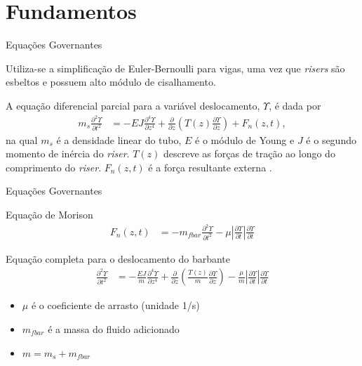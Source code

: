 \documentclass[10pt]{beamer}
\begin{document}
\section{Fundamentos}

\begin{frame}[fragile]{Equações Governantes}

\begin{block}{}
Utiliza-se a simplificação de Euler-Bernoulli para vigas, uma vez que \textit{risers} são esbeltos e possuem alto módulo de cisalhamento.
\end{block}

\begin{block}{}
A equação diferencial parcial para a variável deslocamento, $\Upsilon$, é dada por \begin{align}
	m_s \frac{\partial^2 \Upsilon}{\partial t^2} &= -E J	\frac{\partial^4 \Upsilon}{\partial z^4} + \frac{\partial}{\partial z}\left(T(z) \frac{\partial \Upsilon}{\partial z}\right) + F_n(z,t),
\end{align} na qual $m_s$ é a densidade linear do tubo, $E$ é o módulo de Young e $J$ é o segundo momento de inércia do \textit{riser}. $T(z)$ descreve as forças de tração ao longo do comprimento do \textit{riser}. $F_n(z,t)$ é a força resultante externa \cite{fabricioIFAC}.
\end{block}

\end{frame}

\begin{frame}[fragile]{Equações Governantes}
\begin{block}{Equação de Morison}
\begin{align}
	F_n(z,t) &= -m_{fbar} \frac{\partial^2 \Upsilon}{\partial t^2} - \mu \left|\frac{\partial \Upsilon}{\partial t}\right|\frac{\partial \Upsilon}{\partial t}\label{forceN}
\end{align}
\end{block}
\begin{block}{Equação completa para o deslocamento do barbante}
\begin{align}
	\frac{\partial^2 \Upsilon}{\partial t^2} &= -\frac{EJ}{m}\frac{\partial^4 \Upsilon}{\partial z^4} + \frac{\partial}{\partial z}\left(\frac{T(z)}{m}\frac{\partial \Upsilon}{\partial z}\right) - \frac{\mu}{m}\left|\frac{\partial \Upsilon}{\partial t}\right|\frac{\partial \Upsilon}{\partial t}\label{equacaoBarbante}
	\end{align}
\end{block}
\begin{block}{}
\begin{itemize}
	\item $\mu$ é o coeficiente de arrasto (unidade 1/s) 
	\item $m_{fbar}$ é a massa do fluido adicionado
	\item $m = m_s + m_{fbar}$
\end{itemize}	
\end{block}
\end{frame}
\end{document}
